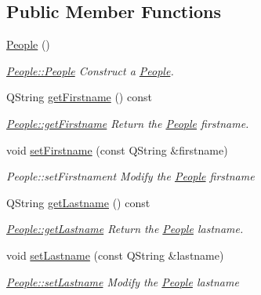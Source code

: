 \subsection*{Public Member Functions}
\begin{DoxyCompactItemize}
\item 
\hypertarget{classModels_1_1People_acdd7ec9d2f9815aeb230ca450cbcdbe3}{\hyperlink{classModels_1_1People_acdd7ec9d2f9815aeb230ca450cbcdbe3}{People} ()}\label{classModels_1_1People_acdd7ec9d2f9815aeb230ca450cbcdbe3}

\begin{DoxyCompactList}\small\item\em \hyperlink{classModels_1_1People_acdd7ec9d2f9815aeb230ca450cbcdbe3}{People\-::\-People} Construct a \hyperlink{classModels_1_1People}{People}. \end{DoxyCompactList}\item 
Q\-String \hyperlink{classModels_1_1People_ae7f110985bb461d8be359a135ec3bc48}{get\-Firstname} () const 
\begin{DoxyCompactList}\small\item\em \hyperlink{classModels_1_1People_ae7f110985bb461d8be359a135ec3bc48}{People\-::get\-Firstname} Return the \hyperlink{classModels_1_1People}{People} firstname. \end{DoxyCompactList}\item 
void \hyperlink{classModels_1_1People_a0bc1380b8c4bb29f59b09300edd1f354}{set\-Firstname} (const Q\-String \&firstname)
\begin{DoxyCompactList}\small\item\em People\-::set\-Firstnament Modify the \hyperlink{classModels_1_1People}{People} {\itshape firstname} \end{DoxyCompactList}\item 
Q\-String \hyperlink{classModels_1_1People_ae3e0992f5711b054a10bc50d8965be3c}{get\-Lastname} () const 
\begin{DoxyCompactList}\small\item\em \hyperlink{classModels_1_1People_ae3e0992f5711b054a10bc50d8965be3c}{People\-::get\-Lastname} Return the \hyperlink{classModels_1_1People}{People} lastname. \end{DoxyCompactList}\item 
void \hyperlink{classModels_1_1People_a550545199147a9947e5c66f9c154bf52}{set\-Lastname} (const Q\-String \&lastname)
\begin{DoxyCompactList}\small\item\em \hyperlink{classModels_1_1People_a550545199147a9947e5c66f9c154bf52}{People\-::set\-Lastname} Modify the \hyperlink{classModels_1_1People}{People} {\itshape lastname} \end{DoxyCompactList}\item 

\end{DoxyCompactItemize}

